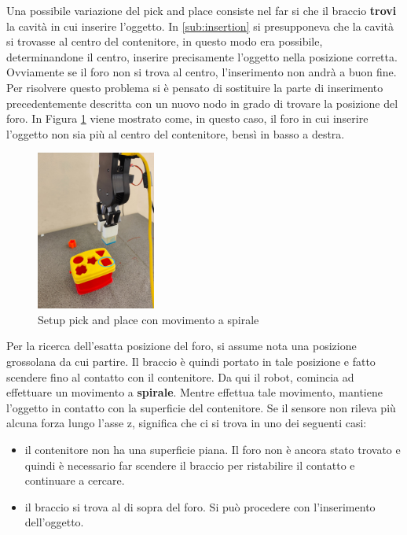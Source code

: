 Una possibile variazione del pick and place consiste nel far si che il braccio \textbf{trovi} la cavit\`{a} in cui inserire l'oggetto. 
In \ref{sub:insertion} si presupponeva che la cavit\`{a} si trovasse al centro del contenitore, in questo modo era possibile, 
determinandone il centro, inserire precisamente l'oggetto nella posizione corretta. Ovviamente se il foro non si trova al centro, 
l'inserimento non andr\`{a} a buon fine. Per risolvere questo problema si \`{e} pensato di sostituire la parte di inserimento 
precedentemente descritta con un nuovo nodo in grado di trovare la posizione del foro\footnotemark{}. 
In Figura \ref{fig:spiral_pick_place} viene mostrato come, in questo caso, il foro in cui inserire l'oggetto non sia pi\`{u} al centro 
del contenitore, bens\`{i} in basso a destra. 
\newpage
\begin{figure}[H]
    \centering
    \includegraphics*[width=0.35\textwidth]{images/spiral_pick_place.jpg}
    \caption{Setup pick and place con movimento a spirale}
    \label{fig:spiral_pick_place}
\end{figure}
Per la ricerca dell'esatta posizione del foro, si assume nota una posizione grossolana da cui partire. 
Il braccio è quindi portato in tale posizione e fatto scendere fino al contatto con il contenitore.
Da qui il robot, comincia ad effettuare un movimento a \textbf{spirale}. 
Mentre effettua tale movimento, mantiene l'oggetto in contatto con la superficie del contenitore. Se il sensore 
non rileva pi\`{u} alcuna forza lungo l'asse z, significa che ci si trova in uno dei seguenti casi:
\begin{itemize}
    \item il contenitore non ha una superficie piana. Il foro non \`{e} ancora stato trovato e quindi \`{e} necessario far scendere 
    il braccio per ristabilire il contatto e continuare a cercare.
    \item il braccio si trova al di sopra del foro. Si pu\`{o} procedere con l'inserimento dell'oggetto.
\end{itemize} 
